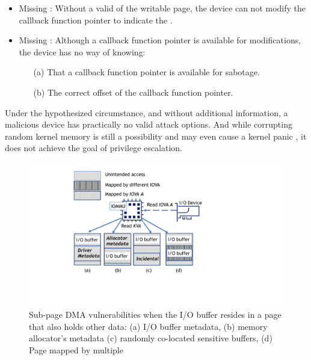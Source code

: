 \begin{itemize}
    \item Missing \means: Without a valid \kva{} of the writable page, the device can not modify the callback function pointer to indicate the \mabaf.
    \item Missing \oportunity: Although a callback function pointer is available for modifications, the device has no way of knowing: 
    \begin{enumerate}
        \item[(a)] That a callback function pointer is available for sabotage.
        \item[(b)] The correct offset of the callback function pointer.
    \end{enumerate}
\end{itemize}

Under the hypothesized circumstance, and without additional information, a malicious device has practically no valid attack options. 
And while corrupting random kernel memory is still a possibility and may even cause a kernel panic \cite{MMT16}, it does not achieve the goal of privilege escalation.

\begin{figure}[t]
    \centering
    \includegraphics[width=1\columnwidth]{figs/subpage.pdf}
    \caption{Sub-page DMA vulnerabilities when the I/O buffer resides in
a page that also holds other data: (a) I/O buffer metadata, (b) memory allocator’s
metadata (c) randomly co-located sensitive buffers, (d) Page mapped by multiple \iova}
    \label{fig:colocation}
\end{figure}

